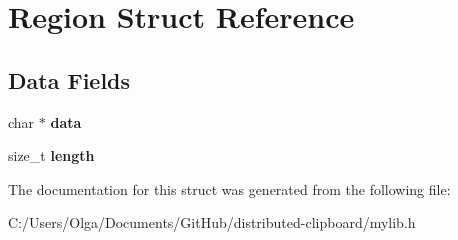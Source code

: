 \hypertarget{struct_region}{}\section{Region Struct Reference}
\label{struct_region}
\subsection*{Data Fields}
\begin{DoxyCompactItemize}
\item 
\mbox{\label{struct_region_a91a70b77df95bd8b0830b49a094c2acb}} 
char $\ast$ {\bfseries data}
\item 
\mbox{\label{struct_region_ae809d5359ac030c60a30a8f0b2294b82}} 
size\+\_\+t {\bfseries length}
\end{DoxyCompactItemize}


The documentation for this struct was generated from the following file\+:\begin{DoxyCompactItemize}
\item 
C\+:/\+Users/\+Olga/\+Documents/\+Git\+Hub/distributed-\/clipboard/mylib.\+h\end{DoxyCompactItemize}
